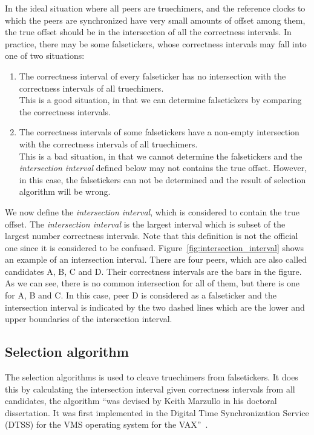 In the ideal situation where all peers are truechimers, and the reference clocks
to which the peers are synchronized have very small amounts of offset among them,
the true offset should be in the intersection of all the correctness intervals. In
practice, there may be some falsetickers, whose correctness intervals may fall
into one of 
two situations:
\begin{enumerate}
    \item The correctness interval of every falseticker has no intersection
        with the correctness intervals of all truechimers.\\ 
        This is a good situation, in that we can determine falsetickers by
        comparing the correctness intervals.
    \item The correctness intervals of some falsetickers have a non-empty
        intersection with the correctness intervals of all truechimers.\\ 
        This is a bad situation, in that we cannot determine the falsetickers and
        the \emph{intersection interval} defined below may not contains the
        true offset. However, in this case, the falsetickers can not be
        determined and the result of selection algorithm will be wrong.
\end{enumerate}

We now define the \emph{intersection interval}, which is considered to contain
the true offset. The \emph{intersection interval} is the largest interval
which is subset of the largest number correctness intervals. Note that this
definition is not the official one since it is considered to be confused.
Figure~\ref{fig:intersection_interval} shows an example of an intersection
interval. There are four peers, which are also called candidates A, B, C and
D\null. Their correctness intervals are the bars in the figure. As we can see,
there is no common intersection for all of them, but there is one for A, B
and C\null. In this case, peer D is considered as a falseticker and the
intersection interval is indicated by the two dashed lines which are the lower
and upper boundaries of the intersection interval.



\subsection{Selection algorithm}%
\label{sub:selection_algorithm}
The selection algorithms is used to cleave truechimers from falsetickers. It
does this by calculating the intersection interval given correctness intervals
from all candidates, the algorithm ``was devised by Keith Marzullo in his
doctoral dissertation.  It was first implemented in the Digital Time
Synchronization Service (DTSS) for the VMS operating system for the
VAX\null''~\cite{clock_selection}.

